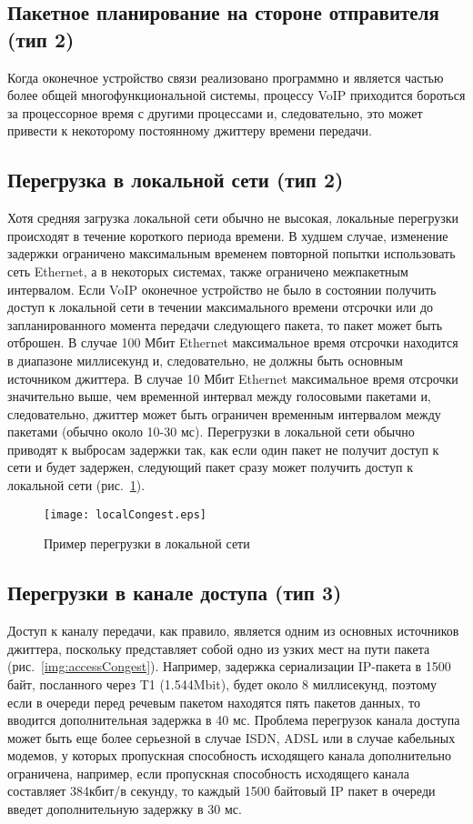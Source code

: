 \subsection{Пакетное планирование на стороне отправителя (тип 2)} \label{subsect2_1_1}
Когда оконечное устройство связи реализовано программно и является частью более общей многофункциональной системы, процессу VoIP приходится бороться за процессорное время с другими процессами и, следовательно, это может привести к некоторому постоянному джиттеру времени передачи.

\subsection{Перегрузка в локальной сети (тип 2)} \label{subsect2_1_2}
Хотя средняя загрузка локальной сети обычно не высокая, локальные перегрузки происходят в течение короткого периода времени. В худшем случае, изменение задержки ограничено максимальным временем повторной попытки использовать сеть Ethernet, а в некоторых системах, также ограничено межпакетным интервалом.
Если VoIP оконечное устройство не было в состоянии получить доступ к локальной сети в течении максимального времени отсрочки или до запланированного момента передачи следующего пакета, то пакет может быть отброшен. В случае 100 Мбит Ethernet максимальное время отсрочки находится в диапазоне миллисекунд и, следовательно, не должны быть основным источником джиттера. В случае 10 Мбит Ethernet максимальное время отсрочки значительно выше, чем временной интервал между голосовыми пакетами и, следовательно, джиттер может быть ограничен временным интервалом между пакетами (обычно около 10-30 мс).
Перегрузки в локальной сети обычно приводят к выбросам задержки так, как если один пакет не получит доступ к сети и будет задержен, следующий пакет сразу может получить доступ к локальной сети (рис. \ref{img:localCongest}).

\begin{figure} [h]
  \center
\texttt{[image: localCongest.eps]}
  \caption{Пример перегрузки в локальной сети \cite{clark}}
  \label{img:localCongest}
\end{figure}

\subsection{Перегрузки в канале доступа (тип 3) } \label{subsect2_1_3}
Доступ к каналу передачи, как правило, является одним из основных источников джиттера, поскольку представляет собой одно из узких мест на пути пакета (рис. \ref{img:accessCongest}). Например, задержка сериализации IP-пакета в 1500 байт, посланного через T1 (1.544Mbit), будет около 8 миллисекунд, поэтому если в очереди перед речевым пакетом находятся пять пакетов данных, то вводится дополнительная задержка в 40 мс. Проблема перегрузок канала доступа может быть еще более серьезной в случае ISDN, ADSL или в случае кабельных модемов, у которых пропускная способность исходящего канала дополнительно ограничена, например, если пропускная способность исходящего канала составляет 384кбит/в секунду, то каждый 1500 байтовый IP пакет в очереди введет дополнительную задержку в 30 мс.

